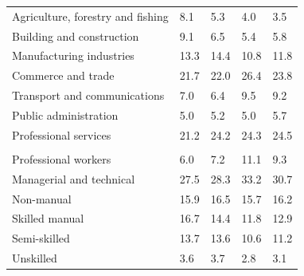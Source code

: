 \documentclass{article}
\begin{document}
\begin{table}[h]
\begin{tabular}{KTTTT}
    \hline
Agriculture, forestry and fishing  & 8.1& 5.3& 4.0& 3.5\\
Building and construction & 9.1& 6.5& 5.4& 5.8\\
Manufacturing industries & 13.3& 14.4& 10.8& 11.8\\
Commerce and trade  & 21.7& 22.0& 26.4& 23.8\\
Transport and communications  & 7.0& 6.4& 9.5& 9.2\\
Public administration & 5.0& 5.2& 5.0& 5.7\\
Professional services & 21.2& 24.2& 24.3& 24.5\\
\hline
    \\ 
    \hline
Professional workers  &  6.0&  7.2 & 11.1&  9.3\\
Managerial and technical & 27.5& 28.3& 33.2& 30.7\\
Non-manual & 15.9& 16.5& 15.7& 16.2\\
Skilled manual & 16.7& 14.4& 11.8& 12.9\\
Semi-skilled & 13.7& 13.6& 10.6& 11.2\\
Unskilled  & 3.6& 3.7& 2.8& 3.1\\
\end{tabular}
\end{table}
\pagebreak
\end{document}
